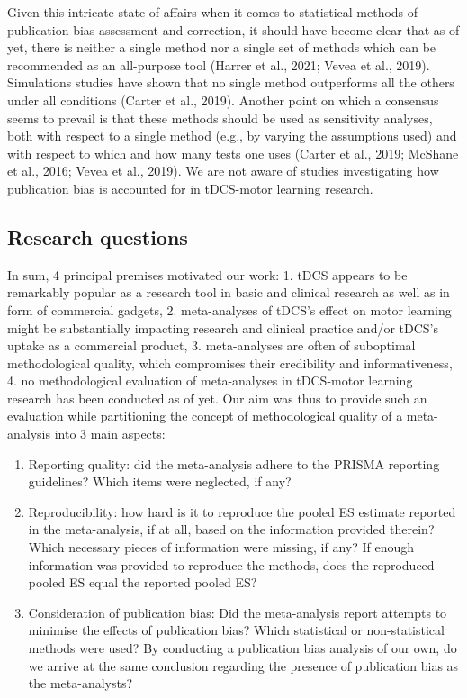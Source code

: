 \documentclass[
  man,floatsintext]{apa6}
\providecommand{\tightlist}{%
  \setlength{\itemsep}{0pt}\setlength{\parskip}{0pt}}
\begin{document}
Given this intricate state of affairs when it comes to statistical methods of publication bias assessment and correction, it should have become clear that as of yet, there is neither a single method nor a single set of methods which can be recommended as an all-purpose tool (Harrer et al., 2021; Vevea et al., 2019). Simulations studies have shown that no single method outperforms all the others under all conditions (Carter et al., 2019). Another point on which a consensus seems to prevail is that these methods should be used as sensitivity analyses, both with respect to a single method (e.g., by varying the assumptions used) and with respect to which and how many tests one uses (Carter et al., 2019; McShane et al., 2016; Vevea et al., 2019). We are not aware of studies investigating how publication bias is accounted for in tDCS-motor learning research.

\hypertarget{research-questions}{%
\subsection{Research questions}\label{research-questions}}

In sum, 4 principal premises motivated our work: 1. tDCS appears to be remarkably popular as a research tool in basic and clinical research as well as in form of commercial gadgets, 2. meta-analyses of tDCS's effect on motor learning might be substantially impacting research and clinical practice and/or tDCS's uptake as a commercial product, 3. meta-analyses are often of suboptimal methodological quality, which compromises their credibility and informativeness, 4. no methodological evaluation of meta-analyses in tDCS-motor learning research has been conducted as of yet. Our aim was thus to provide such an evaluation while partitioning the concept of methodological quality of a meta-analysis into 3 main aspects:

\begin{enumerate}
\def\labelenumi{\arabic{enumi}.}
\tightlist
\item
  Reporting quality: did the meta-analysis adhere to the PRISMA reporting guidelines? Which items were neglected, if any?
\item
  Reproducibility: how hard is it to reproduce the pooled ES estimate reported in the meta-analysis, if at all, based on the information provided therein? Which necessary pieces of information were missing, if any? If enough information was provided to reproduce the methods, does the reproduced pooled ES equal the reported pooled ES?
\item
  Consideration of publication bias: Did the meta-analysis report attempts to minimise the effects of publication bias? Which statistical or non-statistical methods were used? By conducting a publication bias analysis of our own, do we arrive at the same conclusion regarding the presence of publication bias as the meta-analysts?
\end{enumerate}
\end{document}
